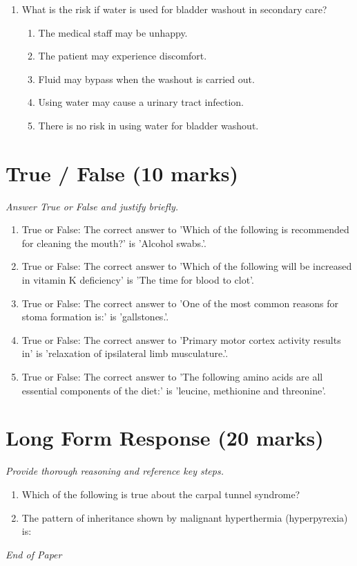 \documentclass[12pt]{article}
\begin{document}
\begin{enumerate}[label=\arabic*.]
\begin{enumerate}[label=(\alph*)]
    \item Digitalhouse
    \item Compuhouse
    \item Autohouse
\end{enumerate}
\item What is the risk if water is used for bladder washout in secondary care?
\begin{enumerate}[label=(\alph*)]
    \item The medical staff may be unhappy.
    \item The patient may experience discomfort.
    \item Fluid may bypass when the washout is carried out.
    \item Using water may cause a urinary tract infection.
    \item There is no risk in using water for bladder washout.
\end{enumerate}
\end{enumerate}

\section*{True / False (10 marks)}
\textit{Answer True or False and justify briefly.}
\begin{enumerate}[label=\arabic*.]
\item True or False: The correct answer to 'Which of the following is recommended for cleaning the mouth?' is 'Alcohol swabs.'.
\item True or False: The correct answer to 'Which of the following will be increased in vitamin K deficiency' is 'The time for blood to clot'.
\item True or False: The correct answer to 'One of the most common reasons for stoma formation is:' is 'gallstones.'.
\item True or False: The correct answer to 'Primary motor cortex activity results in' is 'relaxation of ipsilateral limb musculature.'.
\item True or False: The correct answer to 'The following amino acids are all essential components of the diet:' is 'leucine, methionine and threonine'.
\end{enumerate}

\section*{Long Form Response (20 marks)}
\textit{Provide thorough reasoning and reference key steps.}
\begin{enumerate}[label=\arabic*.]
\item Which of the following is true about the carpal tunnel syndrome?
\item The pattern of inheritance shown by malignant hyperthermia (hyperpyrexia) is:
\end{enumerate}

\vfill
\noindent\textit{End of Paper}
\end{document}

